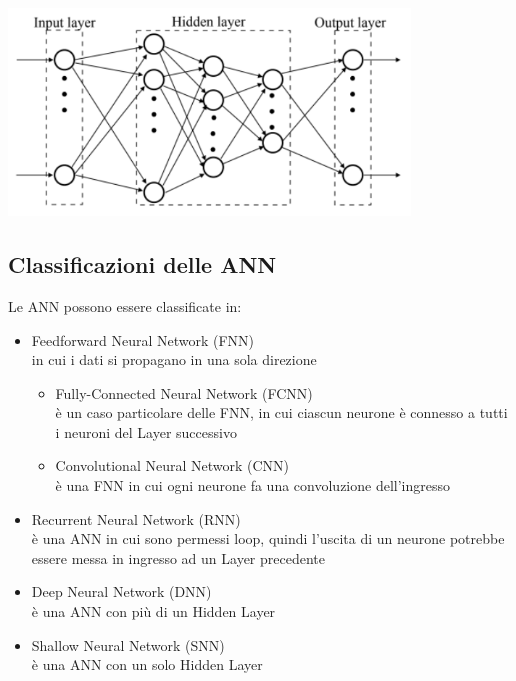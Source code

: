 \includegraphics[width=0.8\textwidth]{Images/ANNmodel.png}
\subsection{Classificazioni delle ANN}
Le ANN possono essere classificate in:
\begin{itemize}
    \item Feedforward Neural Network (FNN) \\in cui i dati si propagano in una sola direzione
    \begin{itemize}
        \item Fully-Connected Neural Network (FCNN) \\è un caso particolare delle FNN, in cui ciascun neurone è connesso a tutti i neuroni del Layer successivo
        \item Convolutional Neural Network (CNN) \\è una  FNN in cui ogni neurone fa una convoluzione dell'ingresso
    \end{itemize}
    \item Recurrent Neural Network (RNN) \\è una ANN in cui sono permessi loop, quindi l'uscita di un neurone potrebbe essere messa in ingresso ad un Layer precedente
    
    \item Deep Neural Network (DNN) \\è una ANN con più di un Hidden Layer
    \item Shallow Neural Network (SNN) \\è una ANN con un solo Hidden Layer
\end{itemize}



